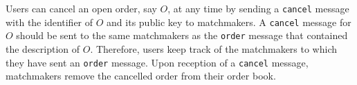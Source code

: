 
Users can cancel an open order, say $ O $, at any time by sending a \texttt{cancel} message with the identifier of $ O $ and its public key to matchmakers.
A \texttt{cancel} message for $ O $ should be sent to the same matchmakers as the \texttt{order} message that contained the description of $ O $.
Therefore, users keep track of the matchmakers to which they have sent an \texttt{order} message.
Upon reception of a \texttt{cancel} message, matchmakers remove the cancelled order from their order book.



